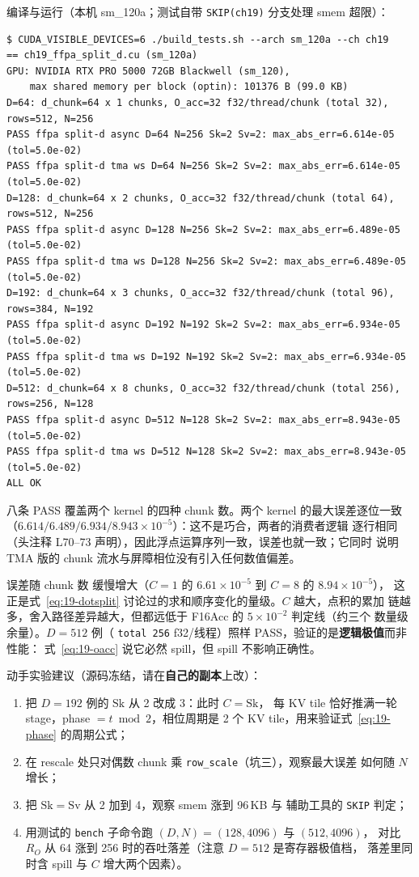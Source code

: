 编译与运行（本机 sm\_120a；测试自带 \texttt{SKIP(ch19)} 分支处理 smem 超限）：

\begin{lstlisting}[style=console]
$ CUDA_VISIBLE_DEVICES=6 ./build_tests.sh --arch sm_120a --ch ch19
== ch19_ffpa_split_d.cu (sm_120a)
GPU: NVIDIA RTX PRO 5000 72GB Blackwell (sm_120),
    max shared memory per block (optin): 101376 B (99.0 KB)
D=64: d_chunk=64 x 1 chunks, O_acc=32 f32/thread/chunk (total 32), rows=512, N=256
PASS ffpa split-d async D=64 N=256 Sk=2 Sv=2: max_abs_err=6.614e-05 (tol=5.0e-02)
PASS ffpa split-d tma ws D=64 N=256 Sk=2 Sv=2: max_abs_err=6.614e-05 (tol=5.0e-02)
D=128: d_chunk=64 x 2 chunks, O_acc=32 f32/thread/chunk (total 64), rows=512, N=256
PASS ffpa split-d async D=128 N=256 Sk=2 Sv=2: max_abs_err=6.489e-05 (tol=5.0e-02)
PASS ffpa split-d tma ws D=128 N=256 Sk=2 Sv=2: max_abs_err=6.489e-05 (tol=5.0e-02)
D=192: d_chunk=64 x 3 chunks, O_acc=32 f32/thread/chunk (total 96), rows=384, N=192
PASS ffpa split-d async D=192 N=192 Sk=2 Sv=2: max_abs_err=6.934e-05 (tol=5.0e-02)
PASS ffpa split-d tma ws D=192 N=192 Sk=2 Sv=2: max_abs_err=6.934e-05 (tol=5.0e-02)
D=512: d_chunk=64 x 8 chunks, O_acc=32 f32/thread/chunk (total 256), rows=256, N=128
PASS ffpa split-d async D=512 N=128 Sk=2 Sv=2: max_abs_err=8.943e-05 (tol=5.0e-02)
PASS ffpa split-d tma ws D=512 N=128 Sk=2 Sv=2: max_abs_err=8.943e-05 (tol=5.0e-02)
ALL OK
\end{lstlisting}

八条 PASS 覆盖两个 kernel 的四种 chunk 数。两个 kernel 的最大误差逐位一致
（$6.614/6.489/6.934/$\allowbreak$8.943\times10^{-5}$）：这不是巧合，两者的消费者逻辑
逐行相同（头注释 L70--73 声明），因此浮点运算序列一致，误差也就一致；它同时
说明 TMA 版的 chunk 流水与屏障相位没有引入任何数值偏差。

误差随 chunk 数
缓慢增大（$C{=}1$ 的 $6.61\times10^{-5}$ 到 $C{=}8$ 的 $8.94\times10^{-5}$），
这正是式~\ref{eq:19-dotsplit} 讨论过的求和顺序变化的量级。$C$ 越大，点积的累加
链越多，舍入路径差异越大，但都远低于 F16Acc 的 $5\times10^{-2}$ 判定线（约三个
数量级余量）。$D{=}512$ 例（
\texttt{total 256} f32/线程）照样 PASS，验证的是\textbf{逻辑极值}而非性能：
式~\ref{eq:19-oacc} 说它必然 spill，但 spill 不影响正确性。

动手实验建议（源码冻结，请在\textbf{自己的副本}上改）：

\begin{enumerate}[itemsep=2pt,topsep=2pt]
  \item 把 $D{=}192$ 例的 $\mathrm{Sk}$ 从 2 改成 3：此时 $C = \mathrm{Sk}$，
        每 KV tile 恰好推满一轮 stage，phase $= t \bmod 2$，相位周期是 2 个
        KV tile，用来验证式~\ref{eq:19-phase} 的周期公式；
  \item 在 rescale 处只对偶数 chunk 乘 \texttt{row\_scale}（坑三），观察最大误差
        如何随 $N$ 增长；
  \item 把 $\mathrm{Sk}=\mathrm{Sv}$ 从 2 加到 4，观察 smem 涨到 96\,KB 与
        辅助工具的 \texttt{SKIP} 判定；
  \item 用测试的 \texttt{bench} 子命令跑 $(D,N) = (128,4096)$ 与 $(512,4096)$，
        对比 $R_O$ 从 64 涨到 256 时的吞吐落差（注意 $D{=}512$ 是寄存器极值档，
        落差里同时含 spill 与 $C$ 增大两个因素）。
\end{enumerate}

